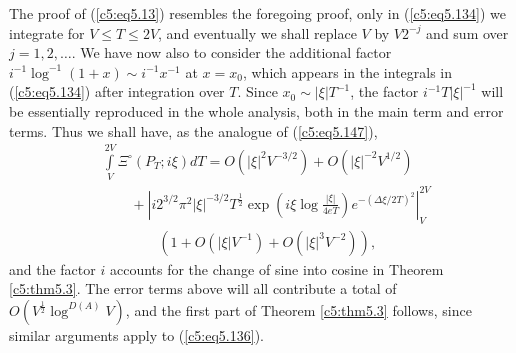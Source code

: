 The proof of (\ref{c5:eq5.13}) resembles the foregoing proof, only in
(\ref{c5:eq5.134}) we integrate for $V \leq T \leq 2V$, and eventually
we shall replace $V$ by $V 2^{-j}$ and sum over $j = 1,2,\ldots$. We
have now also to consider the additional factor $i^{-1} \log^{-1}
(1+x) \sim i^{-1} x^{-1}$ at $x = x_0$, which appears in the integrals
in (\ref{c5:eq5.134}) after integration over $T$. Since $x_0 \sim
|\xi|T^{-1}$, the factor $i^{-1} T |\xi|^{-1}$ will be essentially
reproduced in the whole analysis, both in the main term and error
terms. Thus we shall have, as the analogue of (\ref{c5:eq5.147}), 
\begin{align*}
&\int\limits^{2V}_V \Xi^\circ (P_T;i\xi) d T = O\left(|\xi|^2
  V^{-3/2}\right) + O\left(|\xi|^{-2} V^{1/2}\right)\\ 
&\qquad {}+\left| i2^{3/2} \pi^{2}|\xi|^{-3/2} T^{\frac{1}{2}} \exp
  \left(i\xi \log \frac{|\xi|}{4eT} \right) e^{-(\Delta \xi / 2 T)^2}
\right|^{2V}_V\\
&\qquad\qquad\left(1+O\left(|\xi|V^{-1}\right) + O \left(|\xi|^3
V^{-2}\right)\right),  
\end{align*}
and the factor $i$ accounts for the change of sine into cosine in
Theorem \ref{c5:thm5.3}. The error terms above will all contribute a
total of $O(V^{\frac{1}{2}} \log^{D(A)}V )$, and the first part of
Theorem \ref{c5:thm5.3} follows, since similar arguments apply to
(\ref{c5:eq5.136}). 

